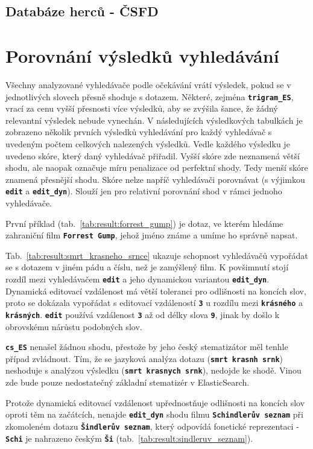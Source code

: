 \documentclass[12pt,letterpaper,oneside,openright]{book}
\newcommand{\bftt}[1]{\texttt{\textbf{#1}}}
\begin{document}
\subsection{Databáze herců - ČSFD}

\section{Porovnání výsledků vyhledávání}
Všechny analyzované vyhledávače podle očekávání vrátí výsledek, pokud se v
jednotlivých slovech přesně shoduje s dotazem. Některé, zejména
\bftt{trigram\_ES}, vrací za cenu vyšší přesnosti více výsledků, aby se zvýšila
šance, že žádný relevantní výsledek nebude vynechán.  V následujících
výsledkových tabulkách je zobrazeno několik prvních výsledků vyhledávání pro
každý vyhledávač s uvedeným počtem celkových nalezených výsledků. Vedle každého
výsledku je uvedeno skóre, který daný vyhledávač přiřadil. Vyšší skóre zde
neznamená větší shodu, ale naopak označuje míru penalizace od perfektní shody.
Tedy menší skóre znamená přesnější shodu. Skóre nelze napříč vyhledávači
porovnávat (s výjimkou \bftt{edit} a \bftt{edit\_dyn}). Slouží jen pro
relativní porovnání shod v rámci jednoho vyhledávače.

\clearpage

První příklad (tab.~\ref{tab:result:forrest_gump}) je dotaz, ve kterém hledáme
zahraniční film \bftt{Forrest Gump}, jehož jméno známe a umíme ho správně
napsat.

\clearpage

Tab.~\ref{tab:result:smrt_krasneho_srnce} ukazuje schopnost vyhledávačů
vypořádat se s dotazem v jiném pádu a číslu, než je zamýšlený film. K
povšimnutí stojí rozdíl mezi vyhledávačem \bftt{edit} a jeho dynamickou
variantou \bftt{edit\_dyn}. Dynamická editovací vzdálenost má větší toleranci
pro odlišnosti na koncích slov, proto se dokázala vypořádat s editovací
vzdáleností \bftt{3} u rozdílu mezi \bftt{krásného} a \bftt{krásných}.
\bftt{edit} používá vzdálenost \bftt{3} až od délky slova \bftt{9}, jinak by
došlo k obrovskému nárůstu podobných slov. 

\bftt{cs\_ES} nenašel žádnou shodu, přestože by jeho český stematizátor měl
tenhle případ zvládnout. Tím, že se jazyková analýza dotazu (\bftt{smrt krasnh
srnk}) neshoduje s analýzou výsledku (\bftt{smrt krasnych srnk}), nedojde ke
shodě. Vinou zde bude pouze nedostatečný základní stematizér v ElasticSearch.


Protože dynamická editovací vzdálenost upřednostňuje odlišnosti na
koncích slov oproti těm na začátcích, nenajde \bftt{edit\_dyn} shodu
filmu \bftt{Schindlerův seznam} při zkomoleném dotazu \bftt{Šindlerův
seznam}, který odpovídá fonetické reprezentaci - \bftt{Schi} je
nahrazeno českým \bftt{Ši} (tab.~\ref{tab:result:sindleruv_seznam}).
\end{document}
